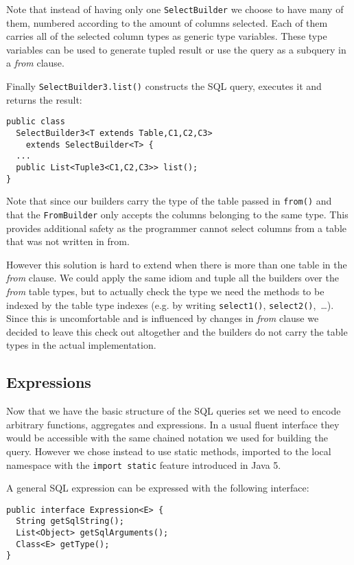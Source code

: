 \documentclass{sig-alternate}
\begin{document}
Note that instead of having only one \verb!SelectBuilder! we choose to have many of them, numbered according to the amount of columns selected. Each of them carries all of the selected column types as generic type variables. These type variables can be used to generate tupled result or use the query as a subquery in a \emph{from} clause.

Finally \verb!SelectBuilder3.list()! constructs the SQL query, executes it and returns the result:

\begin{verbatim}
public class
  SelectBuilder3<T extends Table,C1,C2,C3> 
    extends SelectBuilder<T> {
  ...
  public List<Tuple3<C1,C2,C3>> list();
} 
\end{verbatim}

Note that since our builders carry the type of the table passed in \verb!from()! and that the \verb!FromBuilder! only accepts the columns belonging to the same type. This provides additional safety as the programmer cannot select columns from a table that was not written in from.

However this solution is hard to extend when there is more than one table in the \emph{from} clause. We could apply the same idiom and tuple all the builders over the \emph{from} table types, but to actually check the type we need the methods to be indexed by the table type indexes (e.g. by writing \verb!select1()!, \verb!select2()!,~\ldots). Since this is uncomfortable and is influenced by changes in \emph{from} clause we decided to leave this check out altogether and the builders do not carry the table types in the actual implementation.

\subsection{Expressions}

Now that we have the basic structure of the SQL queries set we need to encode arbitrary functions, aggregates and expressions. In a usual fluent interface they would be accessible with the same chained notation we used for building the query. However we chose instead to use static methods, imported to the local namespace with the \verb!import static! feature introduced in Java 5.

A general SQL expression can be expressed with the following interface:
\begin{verbatim}
public interface Expression<E> {
  String getSqlString();
  List<Object> getSqlArguments();
  Class<E> getType();		
}
\end{verbatim}
\end{document}
